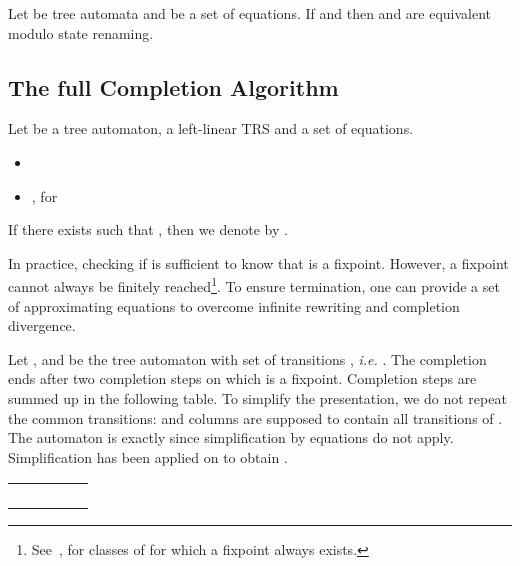 \documentclass[a4paper,11pt]{llncs}
\theoremstyle{plain}
\begin{document}
\begin{theorem}
  \label{theorem:canonical}
  Let  be tree automata and  be a set of 
  equations. If  and  then
 and  are equivalent modulo state renaming.
\end{theorem}




\subsection{The full Completion Algorithm}
\label{sec:completion}

\begin{definition}
\label{def:completion}
Let  be a tree automaton,  a left-linear TRS and  a set of equations. 
\begin{itemize}
\item 
\item , for 
\end{itemize}
If there exists  such that , then we
denote  by .
\end{definition}
In practice, checking if  is sufficient to know
that  is a fixpoint. However, a fixpoint cannot always be finitely
reached\footnote{See~\cite{Genet-Habil}, for classes of  for which a
  fixpoint always exists.}. To ensure termination, one can provide a set of
approximating equations to overcome infinite rewriting and 
completion divergence. 

\begin{example}
  Let ,  and  be
  the tree automaton with set of transitions , {\em i.e.} . The completion ends
  after two completion steps on  which is a fixpoint. Completion
  steps are summed up in the following table. To simplify the presentation, we do
  not repeat the common transitions:  and  columns
  are supposed to contain all transitions of .
The automaton  is exactly  since
simplification by equations do not apply. Simplification has been applied on
 to obtain .

\noindent
{\small
\begin{center}
\begin{tabular}{||r||r|r||r|r||}
\hline 
 &  &  &  & \\
\hline
 &  &  &  & \\
 &  &  &  &  \\ 
 &  &  &  &  \\
            &  &  &  & \\
\hline
\end{tabular}
\end{center}}
\end{example}
\end{document}
